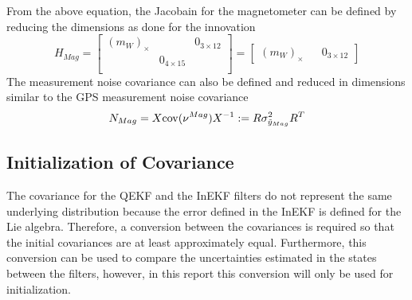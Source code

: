 From the above equation, the Jacobain for the magnetometer can be defined by reducing the dimensions as done for the innovation
\begin{equation}
        H_{Mag} = \begin{bmatrix}
            (m_W)_{\times} & & 0_{3 \times 12} \\
            & 0_{4 \times 15} &\\
            \end{bmatrix} = \begin{bmatrix}
                (m_W)_{\times} & & 0_{3 \times 12}
            \end{bmatrix}
    \label{eq: H_mag InEKF}
\end{equation}
The measurement noise covariance can also be defined and reduced in dimensions similar to the GPS measurement noise covariance
\begin{equation}
    N_{Mag} = X \mathrm{cov}(\nu^{Mag}) X^{-1} := R \sigma^2_{\Tilde{y}_{Mag}} R^T
    \label{eq: N mag InEKF}
\end{equation}


\subsection{Initialization of Covariance}
The covariance for the QEKF and the InEKF filters do not represent the same underlying distribution because the error defined in the InEKF is defined for the Lie algebra. Therefore, a conversion between the covariances is required so that the initial covariances are at least approximately equal. Furthermore, this conversion can be used to compare the uncertainties estimated in the states between the filters, however, in this report this conversion will only be used for initialization.

